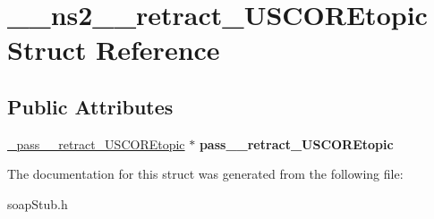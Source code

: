 \hypertarget{struct____ns2____retract__USCOREtopic}{
\section{\_\-\_\-ns2\_\-\_\-retract\_\-USCOREtopic Struct Reference}
\label{struct____ns2____retract__USCOREtopic}
}
\subsection*{Public Attributes}
\begin{DoxyCompactItemize}
\item 
\hypertarget{struct____ns2____retract__USCOREtopic_a478cc1f2e2db7bd5a13c556f8c9f3d11}{
\hyperlink{class__pass____retract__USCOREtopic}{\_\-pass\_\-\_\-retract\_\-USCOREtopic} $\ast$ {\bfseries pass\_\-\_\-retract\_\-USCOREtopic}}
\label{struct____ns2____retract__USCOREtopic_a478cc1f2e2db7bd5a13c556f8c9f3d11}

\end{DoxyCompactItemize}


The documentation for this struct was generated from the following file:\begin{DoxyCompactItemize}
\item 
soapStub.h\end{DoxyCompactItemize}
